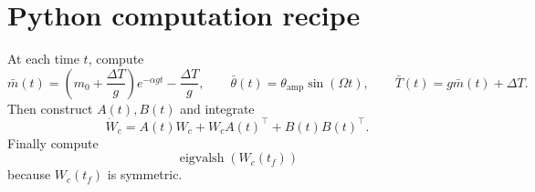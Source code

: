 \documentclass[10pt]{article}
\newcommand{\thb}{\bar\theta}
\newcommand{\mb}{\bar m}
\newcommand{\Tb}{\bar T}
\newcommand{\vphi}{\alpha}
\begin{document}
\section{Python computation recipe}
At each time $t$, compute
\[
    \mb(t)=\left(m_0+\frac{\Delta T}{g}\right)e^{-\vphi gt}-\frac{\Delta T}{g},
    \qquad
    \thb(t)=\theta_{\mathrm{amp}}\sin(\Omega t),
    \qquad
    \Tb(t)=g\mb(t)+\Delta T.
\]
Then construct $A(t),B(t)$ and integrate
\[
    \dot W_c=A(t)W_c+W_cA(t)^{\top}+B(t)B(t)^{\top}.
\]
Finally compute
\[
    \operatorname{eigvalsh}(W_c(t_f))
\]
because $W_c(t_f)$ is symmetric.
\end{document}
